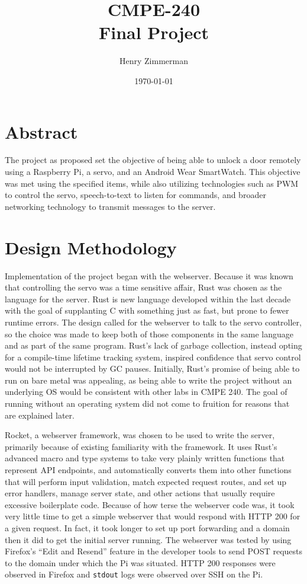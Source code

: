 \documentclass[a4paper]{article}
\begin{document}
\title{CMPE-240 \\ Final Project}
\date{\today}
\author{Henry Zimmerman}
\maketitle



\section{Abstract}
The project as proposed set the objective of being able to unlock a door remotely using a Raspberry Pi, a servo, and an Android Wear SmartWatch.
This objective was met using the specified items, while also utilizing technologies such as PWM to control the servo, speech-to-text to listen for commands, and broader networking technology to transmit messages to the server.

\section{Design Methodology}
Implementation of the project began with the webserver.
Because it was known that controlling the servo was a time sensitive affair, Rust was chosen as the language for the server. 
Rust is new language developed within the last decade with the goal of supplanting C with something just as fast, but prone to fewer runtime errors.
The design called for the webserver to talk to the servo controller, so the choice was made to keep both of those components in the same language and as part of the same program.
Rust's lack of garbage collection, instead opting for a compile-time lifetime tracking system, inspired confidence that servo control would not be interrupted by GC pauses.
Initially, Rust's promise of being able to run on bare metal was appealing, as being able to write the project without an underlying OS would be consistent with other labs in CMPE 240.
The goal of running without an operating system did not come to fruition for reasons that are explained later.

Rocket, a webserver framework, was chosen to be used to write the server, primarily because of existing familiarity with the framework.
It uses Rust's advanced macro and type systems to take very plainly written functions that represent API endpoints, and automatically converts them into other functions that will perform input validation, match expected request routes, and set up error handlers, manage server state, and other actions that usually require excessive boilerplate code.
Because of how terse the webserver code was, it took very little time to get a simple webserver that would respond with HTTP 200 for a given request.
In fact, it took longer to set up port forwarding and a domain then it did to get the initial server running.
The webserver was tested by using Firefox's ``Edit and Resend'' feature in the developer tools to send POST requests to the domain under which the Pi was situated.
HTTP 200 responses were observed in Firefox and \texttt{stdout} logs were observed over SSH on the Pi.
\end{document}
